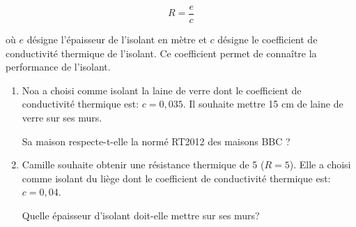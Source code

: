\documentclass[10pt]{article}
\begin{document}
$$R=\dfrac{e}{c}$$ 

 où $e$ désigne l'épaisseur de l'isolant en mètre et $c$ désigne le coefficient de conductivité thermique de l'isolant. Ce coefficient permet de connaître la performance de l'isolant. 

\begin{enumerate}
\item  Noa a choisi comme isolant la laine de verre dont le coefficient de conductivité thermique est: $c = 0,035$. Il souhaite mettre 15 cm de laine de verre sur ses murs. 

Sa maison respecte-t-elle la normé RT2012 des maisons BBC ? 

\item  Camille souhaite obtenir une résistance thermique de 5 ($R = 5$). Elle a choisi comme isolant du liège dont le coefficient de conductivité thermique est: $c = 0,04$. 

Quelle épaisseur d'isolant doit-elle mettre sur ses murs? 

\end{enumerate}

\vspace{0,5cm}
\end{document}
